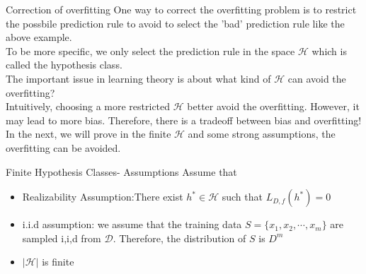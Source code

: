 \documentclass{beamer}
\begin{document}
\begin{frame}{Correction of overfitting}
One way to correct the overfitting problem is to restrict the possbile prediction rule to avoid to select the 'bad' prediction rule like the above example. \\ 
To be more specific, we only select the prediction rule in the space $\mathcal{H}$ which is called the hypothesis class. \\
The important issue in learning theory is about what kind of $\mathcal{H}$ can avoid the overfitting? \\

Intuitively, choosing a more restricted $\mathcal{H}$ better avoid the overfitting. However, it may lead to more bias. Therefore, there is a tradeoff between bias and overfitting! \\
In the next, we will prove in the finite $\mathcal{H}$ and some strong assumptions, the overfitting can be avoided.
\end{frame}
\begin{frame}{Finite Hypothesis Classes- Assumptions}
Assume that 
\begin{itemize}
	\item Realizability Assumption:There exist $h^* \in \mathcal{H}$ such that $L_{D,f}(h^*)=0$
	\item i.i.d assumption: we assume that the training data $S = \{x_1,x_2, \cdots,x_m\}$ are sampled i,i,d from $\mathcal{D}$. Therefore, the distribution of $S$ is $D^m$
	\item $ |\mathcal{H}|$ is finite
\end{itemize}

\end{frame}
\end{document}
